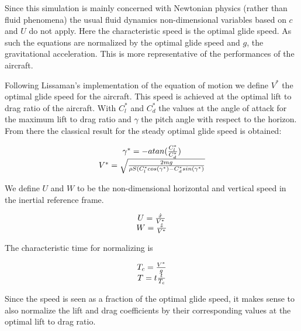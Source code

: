\par Since this simulation is mainly concerned with Newtonian physics (rather than fluid phenomena) the usual fluid dynamics non-dimensional variables based on $c$ and $U$ do not apply.
Here the characteristic speed is the optimal glide speed.
As such the equations are normalized by the optimal glide speed and $g$, the gravitational acceleration.
This is more representative of the performances of the aircraft.

\par Following Lissaman's \cite{lissaman2005wind} implementation of the equation of motion we define $V^*$ the optimal glide speed for the aircraft. 
This speed is achieved at the optimal lift to drag ratio of the aircraft.
With $C_l^*$ and $C_d^*$ the values at the angle of attack for the maximum lift to drag ratio and $\gamma$ the pitch angle with respect to the horizon.
From there the classical result for the steady optimal glide speed is obtained:

\begin{equation}
\begin{array}[c]{c}
  \gamma^*= - atan(\frac{C_l^*}{C_d^*}) \\
  V^* = \sqrt{\frac{2mg}{\rho S (C_l^* cos(\gamma^*) - C_d^* sin(\gamma^*)}}
\end{array}
\label{eqn:glide_speed}
\end{equation}

\par We define $U$ and $W$ to be the non-dimensional horizontal and vertical speed in the inertial reference frame.

\begin{equation}
\begin{array}[c]{c}
  U = \frac{\dot{x}}{V^*} \\
  W= \frac{\dot{z}}{V^*}
\end{array}
\label{eqn:non_dim_speed}
\end{equation}

The characteristic time for normalizing is

\begin{equation}
\begin{array}[c]{c}
  T_c = \frac{V^*}{g}\\
  T=t\frac{t}{T_c}
\end{array}
  \label{eqn:T}
\end{equation}

\par Since the speed is seen as a fraction of the optimal glide speed, it makes sense to also normalize the lift and drag coefficients by their corresponding values at the optimal lift to drag ratio.

